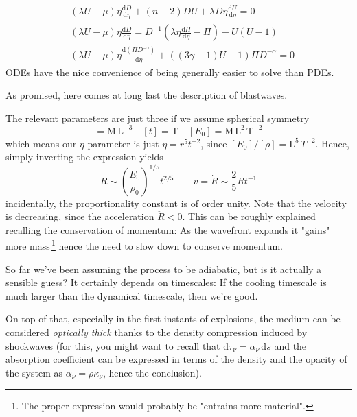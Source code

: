 \begin{align*}
    & (\lambda U-\mu) \eta \frac{\text{d}D}{\text{d}\eta}+(n-2)DU+\lambda D\eta \frac{\text{d}U}{\text{d}\eta} = 0 \\
    & (\lambda U-\mu) \eta \frac{\text{d}D}{\text{d}\eta} = D^{-1}\left(\lambda \eta \frac{\text{d}\Pi}{\text{d}\eta} -\Pi \right) -U(U-1) \\
    & (\lambda U-\mu) \eta \frac{\text{d}(\Pi D^{-\gamma})}{\text{d}\eta}+((3\gamma -1)U -1)\Pi D^{-\alpha} = 0 
\end{align*}
ODEs have the nice convenience of being generally easier to solve than PDEs.
\par As promised, here comes at long last the description of blastwaves.
\par The relevant parameters are just three if we assume spherical symmetry
\begin{equation*}
    [\rho] = \text{M}\,\text{L}^{-3} \quad [t] = \text{T} \quad [E_{0}] = \text{M}\,\text{L}^{2}\,\text{T}^{-2}  
\end{equation*}
which means our $\eta$ parameter is just $\eta = r^{5}t^{-2}$, since $[E_{0}]/[\rho] = \text{L}^{5}\,T^{-2}$. Hence, simply inverting the expression yields
\begin{equation}
    R \sim \left(\frac{E_{0}}{\rho_{0}}\right)^{1/5}t^{2/5} \quad \quad v = \dot{R} \sim \frac{2}{5} Rt^{-1}
    \label{eq:ST_blastwave}
\end{equation}
incidentally, the proportionality constant is of order unity. Note that the velocity is decreasing, since the acceleration $\ddot{R}<0$. This can be roughly explained recalling the conservation of momentum: As the wavefront expands it "gains" more mass\,\footnote{The proper expression would probably be "entrains more material".} hence the need to slow down to conserve momentum.
\par So far we've been assuming the process to be adiabatic, but is it actually a sensible guess? It certainly depends on timescales: If the cooling timescale is much larger than the dynamical timescale, then we're good.
\par On top of that, especially in the first instants of explosions, the medium can be considered \emph{optically thick} thanks to the density compression induced by shockwaves (for this, you might want to recall that $\text{d}\tau_{\nu} = \alpha_{\nu}\,\text{d}s$ and the absorption coefficient can be expressed in terms of the density and the opacity of the system as $\alpha_{\nu}= \rho\kappa_{\nu}$, hence the conclusion).
